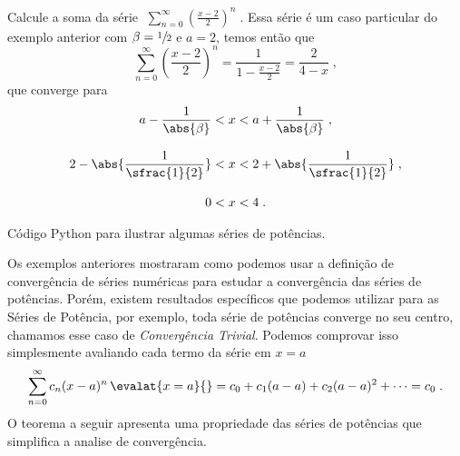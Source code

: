 \begin{example}
  Calcule a soma da série
  \(\;
    \sum_{n=0}^\infty \left(\frac{x-2}{2}\right)^n   \;.
  \)
  \solution
  Essa série é um caso particular do exemplo anterior
  com $\beta=\sfrac{1}{2}$ e $a=2$, temos então que
  \[
    \sum_{n=0}^\infty \left(\frac{x-2}{2}\right)^n
    = \frac{1}{1-\frac{x-2}{2}}
    = \frac{2}{4-x}   \;,
  \]
  que converge para
  \begin{align*}
    a-\frac{1}{\abs{\beta}} <          & \; x < a + \frac{1}{\abs{\beta}}        \;,\\[3mm]
    2 - \abs{\frac{1}{\sfrac{1}{2}}} < & \; x < 2 + \abs{\frac{1}{\sfrac{1}{2}}} \;,\\[3mm]
    0 <                                & \; x < 4   \;.
  \end{align*}
\end{example}

{
  Código Python para ilustrar algumas séries de potências.
}

Os exemplos anteriores mostraram como podemos usar a definição de convergência de
séries numéricas para estudar a convergência das séries de potências.
Porém, existem resultados específicos que podemos utilizar para as Séries de Potência,
por exemplo, toda série de potências converge no seu centro, chamamos esse caso
de \emph{Convergência Trivial}. Podemos comprovar
isso simplesmente avaliando cada termo da série em $x=a$
\[
  \sum_{n=0}^\infty c_n(x-a)^n \,\evalat{x=a}{}
    = c_0 + c_1(a-a) + c_2(a-a)^2 + \cdots
    = c_0   \;.
\]
O teorema a seguir apresenta uma propriedade das séries de potências
que simplifica a analise de convergência.

